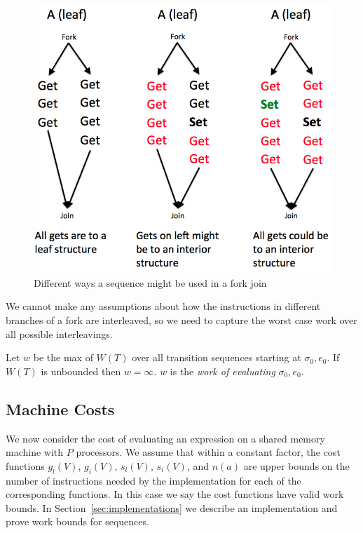 \begin{figure}[!ht]
\centering
\includegraphics[scale=0.3]{fork_join_intuition}
\nocaptionrule \caption{Different ways a sequence might be used in a fork join}
\label{fig:fork_join_intuition}
\end{figure}

We cannot make any assumptions about how the instructions in different
branches of a fork are interleaved, so we need to capture the worst
case work over all possible interleavings.

\begin{definition}
Let $w$ be the max of $W(T)$ over all transition sequences starting at $\sigma_0, e_0$. If $W(T)$ is unbounded then $w = \infty$. $w$ is the \emph{work of evaluating} $\sigma_0, e_0$. 
\end{definition}

\subsection{Machine Costs}

We now consider the cost of evaluating an expression on a shared
memory machine with $P$ processors.  We assume that
within a constant factor, the cost functions $g_l(V)$,
$g_i(V)$, $s_l(V)$, $s_i(V)$, and $n(a)$ are upper bounds on the
number of instructions needed by the implementation for each of the
corresponding functions.  In this case we say the cost functions have
valid work bounds. In Section~\ref{sec:implementations} we describe an implementation and prove work bounds for sequences. 

